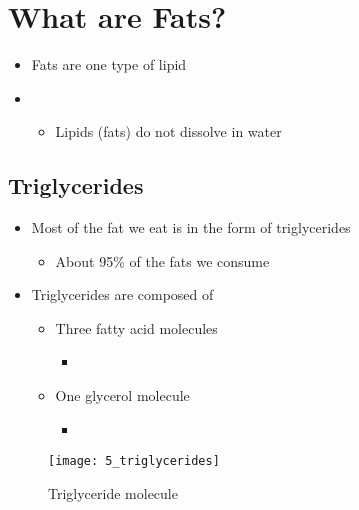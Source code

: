 \documentclass[title={Chapter 5}]{fdsn201notes}
\begin{document}
\maketitle
\setcounter{chapter}{5}

\section{What are Fats?}\label{sec:what-are-fats?}
\begin{itemize}
	\item Fats are one type of lipid
	\item {}
	\begin{itemize}
		\item Lipids (fats) do not dissolve in water
	\end{itemize}
\end{itemize}

\subsection{Triglycerides}\label{subsec:triglycerides}
\begin{itemize}
	\item Most of the fat we eat is in the form of triglycerides
	\begin{itemize}
		\item About 95\% of the fats we consume
	\end{itemize}
	\item Triglycerides are composed of
	\begin{itemize}
		\item Three fatty acid molecules
		\begin{itemize}
			\item {}
		\end{itemize}
		\item One glycerol molecule
		\begin{itemize}
			\item {}
		\end{itemize}
	\end{itemize}
\end{itemize}

\begin{figure}[H]
	\centering
	\texttt{[image: 5\_triglycerides]}
	\caption{Triglyceride molecule}
	\label{fig:triglyceride}
\end{figure}
\end{document}
